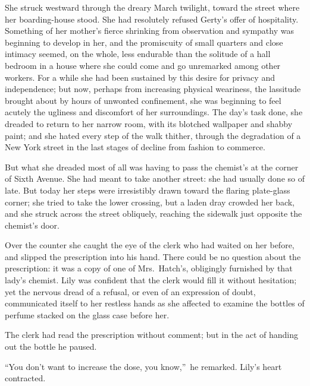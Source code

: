 \documentclass[12pt,a4paper]{book}
\begin{document}
She struck westward through the dreary March twilight, toward the
street where her boarding-house stood. She had resolutely refused
Gerty's offer of hospitality. Something of her mother's fierce
shrinking from observation and sympathy was beginning to develop
in her, and the promiscuity of small quarters and close intimacy
seemed, on the whole, less endurable than the solitude of a hall
bedroom in a house where she could come and go unremarked among
other workers. For a while she had been sustained by this desire
for privacy and independence; but now, perhaps from increasing
physical weariness, the lassitude brought about by hours of
unwonted confinement, she was beginning to feel acutely the
ugliness and discomfort of her surroundings. The day's task done,
she dreaded to return to her narrow room, with its
blotched wallpaper and shabby paint; and she hated every step of
the walk thither, through the degradation of a New York street in
the last stages of decline from fashion to commerce.





But what she dreaded most of all was having to pass the chemist's
at the corner of Sixth Avenue. She had meant to take another
street: she had usually done so of late. But today her steps were
irresistibly drawn toward the flaring plate-glass corner; she
tried to take the lower crossing, but a laden dray crowded her
back, and she struck across the street obliquely, reaching the
sidewalk just opposite the chemist's door.





Over the counter she caught the eye of the clerk who had waited
on her before, and slipped the prescription into his hand. There
could be no question about the prescription: it was a copy of one
of Mrs.\ Hatch's, obligingly furnished by that lady's chemist. 
Lily was confident that the clerk would fill it without
hesitation; yet the nervous dread of a refusal, or even of an
expression of doubt, communicated itself to her restless hands as
she affected to examine the bottles of perfume stacked on the
glass case before her.





The clerk had read the prescription without comment; but in the
act of handing out the bottle he paused.





``You don't want to increase the dose, you know,''\ he remarked. 
Lily's heart contracted.
\end{document}
